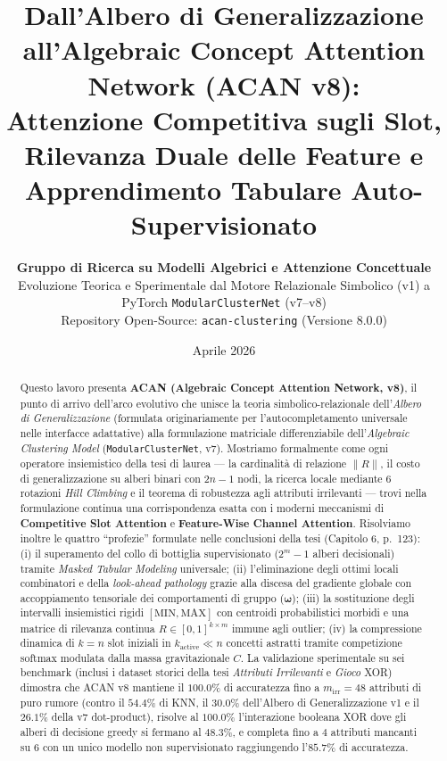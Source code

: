 \documentclass[10pt,a4paper]{article}
\title{\vspace{-0.8cm}\textbf{\Large Dall'Albero di Generalizzazione all'Algebraic Concept Attention Network (ACAN v8):\\
Attenzione Competitiva sugli Slot, Rilevanza Duale delle Feature e Apprendimento Tabulare Auto-Supervisionato}}
\author{\textbf{Gruppo di Ricerca su Modelli Algebrici e Attenzione Concettuale}\\
\small Evoluzione Teorica e Sperimentale dal Motore Relazionale Simbolico (v1) a PyTorch \texttt{ModularClusterNet} (v7--v8)\\
\small Repository Open-Source: \texttt{acan-clustering} (Versione 8.0.0)}
\date{\small Aprile 2026}
\begin{document}
\maketitle

\begin{abstract}
\noindent
Questo lavoro presenta \textbf{ACAN (Algebraic Concept Attention Network, v8)}, il punto di arrivo dell'arco evolutivo che unisce la teoria simbolico-relazionale dell'\textit{Albero di Generalizzazione} (formulata originariamente per l'autocompletamento universale nelle interfacce adattative) alla formulazione matriciale differenziabile dell'\textit{Algebraic Clustering Model} (\texttt{ModularClusterNet}, v7). Mostriamo formalmente come ogni operatore insiemistico della tesi di laurea --- la cardinalit\`a di relazione $\|R\|$, il costo di generalizzazione su alberi binari con $2n-1$ nodi, la ricerca locale mediante 6 rotazioni \textit{Hill Climbing} e il teorema di robustezza agli attributi irrilevanti --- trovi nella formulazione continua una corrispondenza esatta con i moderni meccanismi di \textbf{Competitive Slot Attention} e \textbf{Feature-Wise Channel Attention}. Risolviamo inoltre le quattro ``profezie'' formulate nelle conclusioni della tesi (Capitolo 6, p.~123): (i) il superamento del collo di bottiglia supervisionato ($2^m - 1$ alberi decisionali) tramite \textit{Masked Tabular Modeling} universale; (ii) l'eliminazione degli ottimi locali combinatori e della \textit{look-ahead pathology} grazie alla discesa del gradiente globale con accoppiamento tensoriale dei comportamenti di gruppo ($\boldsymbol{\omega}$); (iii) la sostituzione degli intervalli insiemistici rigidi $[\text{MIN}, \text{MAX}]$ con centroidi probabilistici morbidi e una matrice di rilevanza continua $R \in [0,1]^{k \times m}$ immune agli outlier; (iv) la compressione dinamica di $k=n$ slot iniziali in $k_{\text{active}} \ll n$ concetti astratti tramite competizione softmax modulata dalla massa gravitazionale $C$. La validazione sperimentale su sei benchmark (inclusi i dataset storici della tesi \textit{Attributi Irrilevanti} e \textit{Gioco} XOR) dimostra che ACAN v8 mantiene il $\mathbf{100.0\%}$ di accuratezza fino a $m_{\text{irr}}=48$ attributi di puro rumore (contro il $54.4\%$ di KNN, il $30.0\%$ dell'Albero di Generalizzazione v1 e il $26.1\%$ della v7 dot-product), risolve al $\mathbf{100.0\%}$ l'interazione booleana XOR dove gli alberi di decisione greedy si fermano al $48.3\%$, e completa fino a $4$ attributi mancanti su $6$ con un unico modello non supervisionato raggiungendo l'$\mathbf{85.7\%}$ di accuratezza.
\end{abstract}
\end{document}

